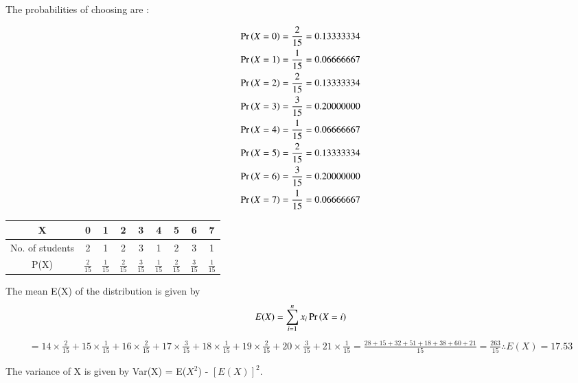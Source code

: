 \documentclass[journal,12pt,twocolumn]{IEEEtran}
\begin{document}
The probabilities of choosing are :

\begin{align*}
    \Pr\left(X=0\right) = \frac {2}{15} = 0.13333334
   \\ \Pr\left(X=1\right) = \frac {1}{15} = 0.06666667
   \\ \Pr\left(X=2\right) = \frac {2}{15} = 0.13333334
   \\ \Pr\left(X=3\right) = \frac {3}{15} = 0.20000000
   \\\Pr\left(X=4\right) = \frac {1}{15} = 0.06666667
   \\ \Pr\left(X=5\right) = \frac {2}{15} = 0.13333334
   \\ \Pr\left(X=6\right) = \frac {3}{15} = 0.20000000
   \\ \Pr\left(X=7\right) = \frac {1}{15} = 0.06666667
\end{align*}
   
\begin{center}
\begin{tabular}{|c|c|c|c|c|c|c|c|c|}
\hline
{X} & 0 & 1 & 2 & 3 & 4 & 5 & 6 & 7 \\
\hline
{No. of students} & 2 & 1 & 2 & 3 & 1 & 2 & 3 & 1 \\
\hline

{P(X)} & $\frac {2}{15}$ & $\frac {1}{15}$ & $\frac {2}{15}$ & $\frac {3}{15}$ & $\frac {1}{15}$ & $\frac {2}{15}$ & $\frac {3}{15}$ & $\frac {1}{15}$
\\

\hline 
\end{tabular}
\end{center}

    The mean E(X) of the distribution is given by 
    \begin{align*}
      E(X) = \sum_{i=1}^n x_i \Pr\left(X=i\right)
    \end{align*}
 \begin{multline}
   
     =  14 \times \frac{2}{15} + 15\times \frac{1}{15} + 16\times \frac{2}{15} + 17\times \frac{3}{15} + 18 \times \frac{1}{15} + 19\times \frac{2}{15} + 20\times \frac{3}{15} + 21\times \frac{1}{15}
     =\frac{28+15+32+51+18+38+60+21}{15}
     =\frac{263}{15}
    \therefore {E(X) = 17.53}
\end{multline}
 
  The variance of X is given by {Var(X) =  E($X^2$) - $[E(X)]^2$.}
\end{document}
